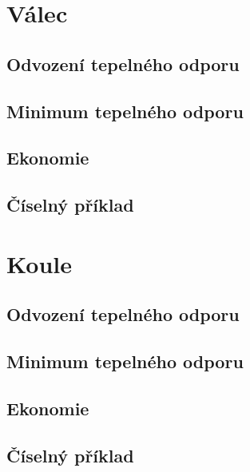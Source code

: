 \documentclass{article}
\begin{document}



\maketitle
\tableofcontents
\newpage



\section{Válec}


\subsection{Odvození tepelného odporu}


\subsection{Minimum tepelného odporu}


\subsection{Ekonomie}


\subsection{Číselný příklad}




\section{Koule}


\subsection{Odvození tepelného odporu}


\subsection{Minimum tepelného odporu}


\subsection{Ekonomie}


\subsection{Číselný příklad}
\end{document}
